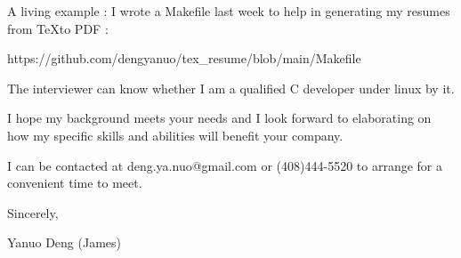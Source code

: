 { \bigbreak } 
A living example : I wrote a Makefile last week to help in generating my resumes from \TeX to PDF : 

\centerline{
https://github.com/dengyanuo/tex\_resume/blob/main/Makefile
}

The interviewer can know whether I am a qualified C developer under linux by it.

{ \bigbreak } 
I hope my background meets your needs and I look
forward to elaborating on how my specific skills and abilities will benefit your company.

{ \bigbreak } 
I can be contacted at deng.ya.nuo@gmail.com
or (408)444-5520 to arrange for a convenient time to meet.

{ \bigbreak } 




\vskip 60pt

{ \bigbreak } 
Sincerely,

Yanuo Deng (James)

\bye
